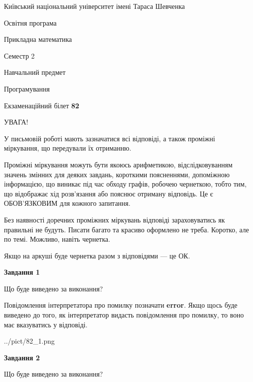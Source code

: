 \documentclass[12pt, ukrainian]{article}
\begin{document}
{{\begin {small}\par
{ \center  Київський національний університет імені Тараса Шевченка \par}
{\parbox {5 cm}{Освітня програма \hfill}{\parbox {7 cm}{Прикладна математика \hfill}}\parbox {6 cm}{\hfill Семестр 2}}\par
{\parbox {5 cm} {Навчальний предмет \hfill}\parbox {7 cm}{Програмування \hfill}\parbox {6cm}{\hfill}\par}\vspace{-7pt} \end{small}}{\center Екзаменаційний білет \No \textbf
{ 82 }\par}}
{
\begin {large}
УВАГА!

У письмовій роботі мають зазначатися всі відповіді, а також проміжні міркування, що передували їх отриманню.

Проміжні міркування можуть бути якоюсь арифметикою, відслідковуванням зна\-чень змінних для деяких завдань,
короткими поясненнями, допоміжною інформацією, що виникає під час обходу графів, робочею чернеткою,
тобто тим, що відображає хід розв’язання або пояснює отриману відповідь.
Це є ОБОВ’ЯЗКОВИМ для кожного запитання.

Без наявності доречних проміжних міркувань відповіді зараховуватись як правиль\-ні не будуть.
Писати багато та красиво оформлено не треба. Коротко, але по темі. Можли\-во, навіть чернетка.

Якщо на аркуші буде чернетка разом з відповідями --- це ОК.

\newpage

{\begin {center}\textbf{Завдання 1}\end {center}}\par
Що буде виведено за виконання?

Повідомлення інтерпретатора про помилку позначати \textbf{error}.
Якщо щось буде виведено до того, як інтерпретатор видасть повідомлення про помилку, 
то воно має вказуватись у відповіді. \par


\begin{center}
	{../pict/82_1.png}
\end{center}
\newpage

{\begin {center}\textbf{Завдання 2}\end {center}}\par
Що буде виведено за виконання?


\end{large}}
\end{document}

